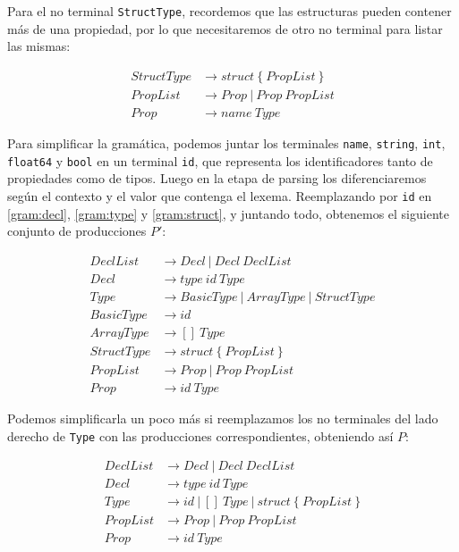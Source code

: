 Para el no terminal \texttt{StructType}, recordemos que las estructuras pueden
contener más de una propiedad, por lo que necesitaremos de otro no terminal
para listar las mismas:

\begin{equation} \label{gram:struct}
\begin{split}
StructType & \rightarrow struct~\{~PropList~\} \\
PropList & \rightarrow Prop~|~Prop~PropList \\
Prop & \rightarrow name~Type
\end{split}
\end{equation}

Para simplificar la gramática, podemos juntar los terminales \texttt{name},
\texttt{string}, \texttt{int}, \texttt{float64} y \texttt{bool} en un terminal
\texttt{id}, que representa los identificadores tanto de propiedades como de
tipos. Luego en la etapa de parsing los diferenciaremos según el contexto y el
valor que contenga el lexema. Reemplazando por \texttt{id} en \ref{gram:decl},
\ref{gram:type} y \ref{gram:struct}, y juntando todo, obtenemos el siguiente
conjunto de producciones $P'$:


\begin{equation}
\begin{split}
DeclList & \rightarrow Decl~|~Decl~DeclList  \\
Decl & \rightarrow type~id~Type \\
Type & \rightarrow BasicType~|~ArrayType~|~StructType \\
BasicType & \rightarrow id \\
ArrayType & \rightarrow []~Type \\
StructType & \rightarrow struct~\{~PropList~\} \\
PropList & \rightarrow Prop~|~Prop~PropList \\
Prop & \rightarrow id~Type
\end{split}
\end{equation}

Podemos simplificarla un poco más si reemplazamos los no terminales del lado
derecho de \texttt{Type} con las producciones correspondientes, obteniendo así
$P$:

\begin{equation}
\begin{split}
DeclList & \rightarrow Decl~|~Decl~DeclList  \\
Decl & \rightarrow type~id~Type \\
Type & \rightarrow id~|~[]~Type~|~struct~\{~PropList~\} \\
PropList & \rightarrow Prop~|~Prop~PropList \\
Prop & \rightarrow id~Type
\end{split}
\end{equation}

